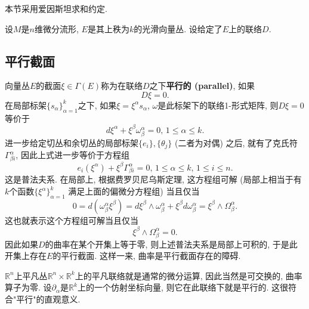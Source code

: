 
本节采用爱因斯坦求和约定.

设$M$是$n$维微分流形, $E$是其上秩为$k$的光滑向量丛. 设给定了$E$上的联络$D$.

\subsection{平行截面}

向量丛$E$的截面$\xi\in\Gamma(E)$称为在联络$D$之下\textbf{平行的 (parallel)}, 如果
$$D\xi=0.$$
在局部标架$\{s_\alpha\}_{\alpha=1}^k$之下, 如果$\xi=\xi^\alpha s_\alpha$, $\omega$是此标架下的联络1-形式矩阵, 则$D\xi=0$等价于
$$
d\xi^\alpha+\xi^\beta\omega^\alpha_\beta=0,\,1\leq \alpha\leq k.
$$
进一步给定切丛和余切丛的局部标架$\{e_i\},\{\theta_j\}$ (二者为对偶) 之后, 就有了克氏符$\Gamma_{\beta i}^\alpha$, 因此上式进一步等价于方程组
$$
e_i(\xi^\alpha)+\xi^\beta\Gamma^\alpha_{\beta i}=0,\,1\leq \alpha\leq k,\,1\leq i\leq n.
$$
这是普法夫系. 在局部上, 根据费罗贝尼乌斯定理, 这方程组可解 (局部上相当于有$k$个函数$\{\xi^\alpha\}_{\alpha=1}^k$ 满足上面的偏微分方程组) 当且仅当
$$
0=d(\omega^\alpha_\beta\xi^\beta)=d\xi^\beta\wedge\omega^\alpha_\beta+\xi^\beta d\omega^\alpha_\beta=\xi^\beta\wedge\Omega_\beta^\alpha.
$$
这也就表示这个方程组可解当且仅当
$$
\xi^\beta\wedge\Omega_\beta^\alpha=0.
$$
因此如果$D$的曲率在某个开集上等于零, 则上述普法夫系是局部上可积的, 于是此开集上存在$E$的平行截面. 这样一来, 曲率是平行截面存在的障碍.

$\mathbb{R}^n$上平凡丛$\mathbb{R}^n\times\mathbb{R}^k$上的平凡联络就是通常的微分运算, 因此当然是可交换的, 曲率算子为零. 设$\partial_\alpha$是$\mathbb{R}^k$上的一个仿射坐标向量, 则它在此联络下就是平行的. 这很符合"平行"的直观意义. 

